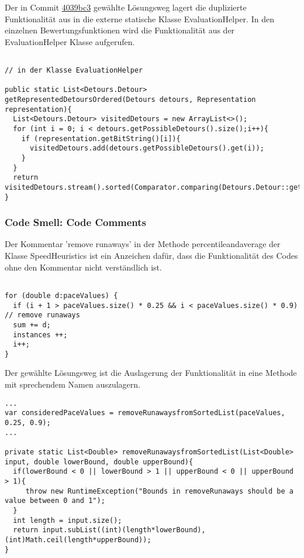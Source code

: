 Der in Commit \href{commit https://github.com/reichert-p/GPXrechner/commit/4039bc31f6310508875c59ed44b6b227f2f0510d}{4039bc3} gewählte Lösungsweg lagert die duplizierte Funktionalität aus in die externe statische Klasse EvaluationHelper. In den einzelnen Bewertungsfunktionen wird die Funktionalität aus der EvaluationHelper Klasse aufgerufen.

\begin{lstlisting}

// in der Klasse EvaluationHelper 

public static List<Detours.Detour> getRepresentedDetoursOrdered(Detours detours, Representation representation){
  List<Detours.Detour> visitedDetours = new ArrayList<>();
  for (int i = 0; i < detours.getPossibleDetours().size();i++){
    if (representation.getBitString()[i]){
      visitedDetours.add(detours.getPossibleDetours().get(i));
    }
  }
  return visitedDetours.stream().sorted(Comparator.comparing(Detours.Detour::getPosition)).toList();
}

\end{lstlisting}


\subsubsection{Code Smell: Code Comments}

Der Kommentar 'remove runaways' in der Methode percentileandaverage der Klasse SpeedHeuristics ist ein Anzeichen dafür, dass die Funktionalität des Codes ohne den Kommentar nicht verständlich ist.


\begin{lstlisting}

for (double d:paceValues) {
  if (i + 1 > paceValues.size() * 0.25 && i < paceValues.size() * 0.9) // remove runaways
  sum += d;
  instances ++;
  i++;
}
\end{lstlisting}

Der gewählte Lösungsweg ist die Auslagerung der Funktionalität in eine Methode mit sprechendem Namen auszulagern.

\begin{lstlisting}
...
var consideredPaceValues = removeRunawaysfromSortedList(paceValues, 0.25, 0.9);
...

private static List<Double> removeRunawaysfromSortedList(List<Double> input, double lowerBound, double upperBound){
  if(lowerBound < 0 || lowerBound > 1 || upperBound < 0 || upperBound > 1){
     throw new RuntimeException("Bounds in removeRunaways should be a value between 0 and 1");
  }
  int length = input.size();
  return input.subList((int)(length*lowerBound),(int)Math.ceil(length*upperBound));
}

\end{lstlisting}


